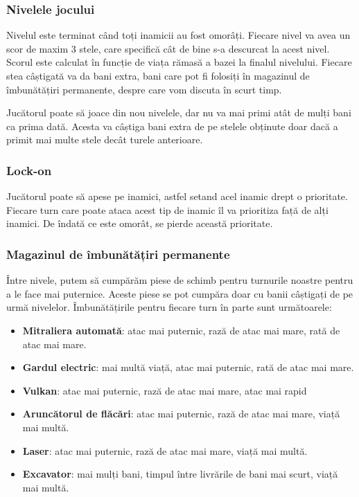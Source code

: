 \documentclass[12pt, a4paper]{article}
\begin{document}
	
	
	
	
	\subsubsection{Nivelele jocului}
	
	Nivelul este terminat când toți inamicii au fost omorâți. Fiecare nivel va avea un scor de maxim 3 stele, care specifică cât de bine s-a descurcat la acest nivel. Scorul este calculat în funcție de viața rămasă a bazei la finalul nivelului. Fiecare stea câștigată va da bani extra, bani care pot fi folosiți în magazinul de îmbunătățiri permanente, despre care vom discuta în scurt timp.
	\newline
	
	Jucătorul poate să joace din nou nivelele, dar nu va mai primi atât de mulți bani ca prima dată. Acesta va câștiga bani extra de pe stelele obținute doar dacă a primit mai multe stele decât turele anterioare.
	
	
	
	
	
	\subsubsection{Lock-on}
	
	Jucătorul poate să apese pe inamici, astfel setand acel inamic drept o prioritate. Fiecare turn care poate ataca acest tip de inamic îl va prioritiza față de alți inamici. De îndată ce este omorât, se pierde această prioritate.
	
	
	
	
	
	\subsubsection{Magazinul de îmbunătățiri permanente}
	
	Între nivele, putem să cumpărăm piese de schimb pentru turnurile noastre pentru a le face mai puternice. Aceste piese se pot cumpăra doar cu banii câștigați de pe urmă nivelelor. Îmbunătățirile pentru fiecare turn în parte sunt următoarele:
	
	\begin{itemize}
		\item \textbf{Mitraliera automată}: atac mai puternic, rază de atac mai mare, rată de atac mai mare.
		\item \textbf{Gardul electric}: mai multă viață, atac mai puternic, rată de atac mai mare.
		\item \textbf{Vulkan}: atac mai puternic, rază de atac mai mare, atac mai rapid
		\item \textbf{Aruncătorul de flăcări}: atac mai puternic, rază de atac mai mare, viață mai multă.
		\item \textbf{Laser}: atac mai puternic, rază de atac mai mare, viață mai multă.
		\item \textbf{Excavator}: mai mulți bani, timpul între livrările de bani mai scurt, viață mai multă.
	\end{itemize}
	
\end{document}
